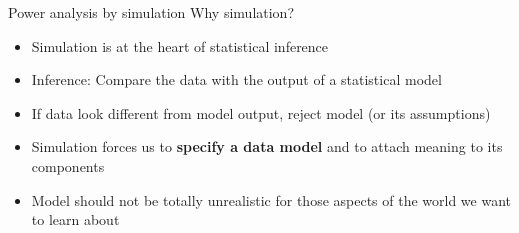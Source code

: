 \documentclass[aspectratio=169]{beamer}
\begin{document}
% 
% 
% 
% 
% 

\begin{frame}{Power analysis by simulation}
  Why simulation?
  \begin{itemize}
    \item Simulation is at the heart of statistical inference
    \item Inference: Compare the data with the output of a statistical model
    \item If data look different from model output, reject model (or its assumptions)
    \item Simulation forces us to {\bf specify a data model} and to attach
      meaning to its components
    \item Model should not be totally unrealistic for those aspects of the
      world we want to learn about
  \end{itemize}
  \nocite{Wickelmaier2022}
\end{frame}
\end{document}
